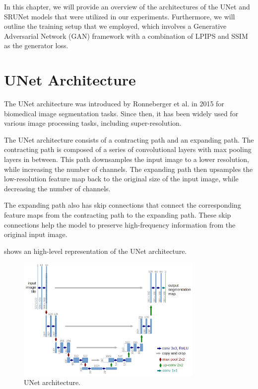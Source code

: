 \label{chap:Architectures}

In this chapter, we will provide an overview of the architectures of the UNet and SRUNet models that were utilized in our experiments. Furthermore, we will outline the training setup that we employed, which involves a Generative Adversarial Network (GAN) framework with a combination of LPIPS and SSIM as the generator loss.

\section{UNet Architecture}

The UNet architecture was introduced by Ronneberger et al. \cite{ronneberger2015u} in 2015 for biomedical image segmentation tasks. Since then, it has been widely used for various image processing tasks, including super-resolution.

The UNet architecture consists of a contracting path and an expanding path. The contracting path is composed of a series of convolutional layers with max pooling layers in between. This path downsamples the input image to a lower resolution, while increasing the number of channels. The expanding path then upsamples the low-resolution feature map back to the original size of the input image, while decreasing the number of channels.

The expanding path also has skip connections that connect the corresponding feature maps from the contracting path to the expanding path. These skip connections help the model to preserve high-frequency information from the original input image.

 shows an high-level representation of the UNet architecture.

\begin{figure}[h]
\centering
\includegraphics[width=0.8\textwidth]{static/unet_architecture.png}
\caption{UNet architecture.}
\label{fig:unet}
\end{figure}

